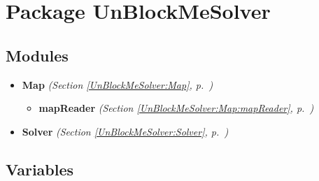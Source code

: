 %
%
%


\section{Package UnBlockMeSolver}

    \label{UnBlockMeSolver}


\subsection{Modules}

\begin{itemize}
\setlength{\parskip}{0ex}
\item \textbf{Map}
  \textit{(Section \ref{UnBlockMeSolver:Map}, p.~\pageref{UnBlockMeSolver:Map})}

  \begin{itemize}
\setlength{\parskip}{0ex}
    \item \textbf{mapReader}
  \textit{(Section \ref{UnBlockMeSolver:Map:mapReader}, p.~\pageref{UnBlockMeSolver:Map:mapReader})}

  \end{itemize}
\item \textbf{Solver}
  \textit{(Section \ref{UnBlockMeSolver:Solver}, p.~\pageref{UnBlockMeSolver:Solver})}

\end{itemize}



  \subsection{Variables}


